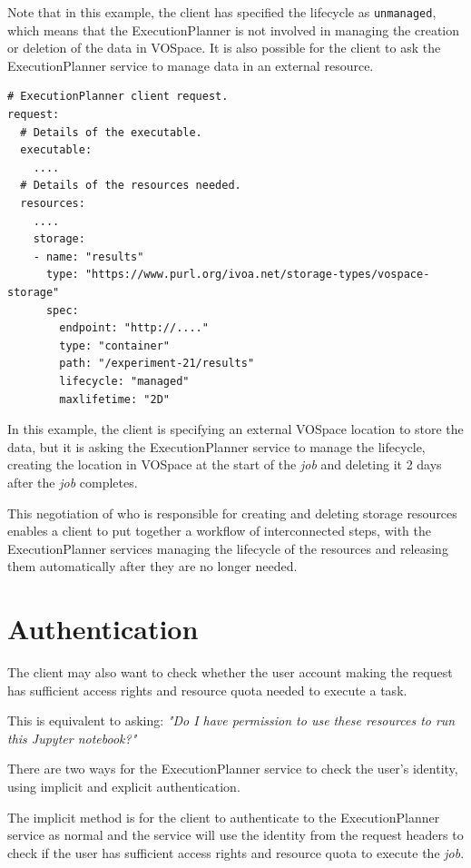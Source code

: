 \documentclass[11pt,a4paper]{ivoa}
\newcommand{\vospace} {VOSpace}
\newcommand{\execplanner} {ExecutionPlanner}
\newcommand{\jupyternotebook} {Jupyter notebook}
\newcommand{\codeword}[1] {\texttt{#1}}
\newcommand{\job} {\textit{job}}
\newcommand{\task} {task}
\begin{document}
Note that in this example, the client has specified the lifecycle as \codeword{unmanaged},
which means that the \execplanner{} is not involved in managing the creation or deletion
of the data in \vospace.
It is also possible for the client to ask the \execplanner{} service to manage
data in an external resource.

\begin{lstlisting}[]
# ExecutionPlanner client request.
request:
  # Details of the executable.
  executable:
    ....
  # Details of the resources needed.
  resources:
    ....
    storage:
    - name: "results"
      type: "https://www.purl.org/ivoa.net/storage-types/vospace-storage"
      spec:
        endpoint: "http://...."
        type: "container"
        path: "/experiment-21/results"
        lifecycle: "managed"
        maxlifetime: "2D"
\end{lstlisting}

In this example, the client is specifying an external \vospace{} location to store the data,
but it is asking the \execplanner{} service to manage the lifecycle, creating the location
in \vospace{} at the start of the \job{} and deleting it 2 days after the \job{} completes.

This negotiation of who is responsible for creating and deleting storage resources
enables a client to put together a workflow of interconnected steps, with the
\execplanner{} services
managing the lifecycle of the resources and releasing them automatically after they
are no longer needed.

\section{Authentication}
\label{authentication}

The client may also want to check whether the user account making the request
has sufficient access rights and resource quota needed to execute a \task{}.

This is equivalent to asking:
\textit{"Do I have permission to use these resources to run this \jupyternotebook{}?"}

There are two ways for the \execplanner{} service to check the user's identity,
using implicit and explicit authentication.

The implicit method is for the client to authenticate to the \execplanner{} service
as normal and the service will use the identity from the request headers to check if the
user has sufficient access rights and resource quota to execute the \job{}.
\end{document}
